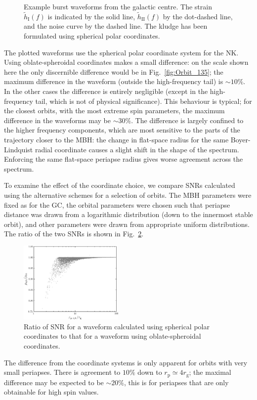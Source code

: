 \documentclass[useAMS,usedcolumn,usegraphicx,usenatbib]{mn2e}
\newcommand{\figref}[1]{Fig.~\ref{fig:#1}}
\newcommand{\sub}[1]{\ensuremath{_\mathrm{#1}}}
\begin{document}
\begin{figure}
\begin{center}
\caption{Example burst waveforms from the galactic centre. The strain $\widetilde{h}\sub{I}(f)$ is indicated by the solid line, $\widetilde{h}\sub{II}(f)$ by the dot-dashed line, and the noise curve by the dashed line. The kludge has been formulated using spherical polar coordinates.\label{fig:Examples}}
  \end{center}
\end{figure}

The plotted waveforms use the spherical polar coordinate system for the NK. Using oblate-spheroidal coordinates makes a small difference: on the scale shown here the only discernible difference would be in \figref{Orbit_135}; the maximum difference in the waveform (outside the high-frequency tail) is $\sim 10\%$. In the other cases the difference is entirely negligible (except in the high-frequency tail, which is not of physical significance). This behaviour is typical; for the closest orbits, with the most extreme spin parameters, the maximum difference in the waveforms may be $\sim30\%$. The difference is largely confined to the higher frequency components, which are most sensitive to the parts of the trajectory closer to the MBH: the change in flat-space radius for the same Boyer-Lindquist radial coordinate causes a slight shift in the shape of the spectrum. Enforcing the same flat-space periapse radius gives worse agreement across the spectrum.

To examine the effect of the coordinate choice, we compare SNRs calculated using the alternative schemes for a selection of orbits. The MBH parameters were fixed as for the GC, the orbital parameters were chosen such that periapse distance was drawn from a logarithmic distribution (down to the innermost stable orbit), and other parameters were drawn from appropriate uniform distributions. The ratio of the two SNRs is shown in \figref{Oblate_sphere}.
\begin{figure}
\begin{center}
 \includegraphics[width=0.45\textwidth]{Fig_SNR_ratio}
 \caption{Ratio of SNR for a waveform calculated using spherical polar coordinates to that for a waveform using oblate-spheroidal coordinates.\label{fig:Oblate_sphere}}
   \end{center}
\end{figure}
The difference from the coordinate systems is only apparent for orbits with very small periapses. There is agreement to $10\%$ down to $r\sub{p} \simeq 4 r\sub{g}$; the maximal difference may be expected to be $\sim 20\%$, this is for periapses that are only obtainable for high spin values.
\end{document}
